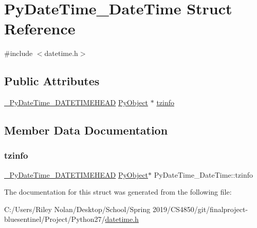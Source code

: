 \hypertarget{struct_py_date_time___date_time}{}\section{Py\+Date\+Time\+\_\+\+Date\+Time Struct Reference}
\label{struct_py_date_time___date_time}


{\ttfamily \#include $<$datetime.\+h$>$}

\subsection*{Public Attributes}
\begin{DoxyCompactItemize}
\item 
\mbox{\hyperlink{datetime_8h_a6234d690c9278e610c9201ad7190dd0e}{\+\_\+\+Py\+Date\+Time\+\_\+\+D\+A\+T\+E\+T\+I\+M\+E\+H\+E\+AD}} \mbox{\hyperlink{_python27_2object_8h_aadc84ac7aed2cfa6f20c25f62bf3dac7}{Py\+Object}} $\ast$ \mbox{\hyperlink{struct_py_date_time___date_time_a11483552924818dd195700bba9e1f492}{tzinfo}}
\end{DoxyCompactItemize}


\subsection{Member Data Documentation}
\mbox{\label{struct_py_date_time___date_time_a11483552924818dd195700bba9e1f492}} 
\subsubsection{\texorpdfstring{tzinfo}{tzinfo}}
{\footnotesize\ttfamily \mbox{\hyperlink{datetime_8h_a6234d690c9278e610c9201ad7190dd0e}{\+\_\+\+Py\+Date\+Time\+\_\+\+D\+A\+T\+E\+T\+I\+M\+E\+H\+E\+AD}} \mbox{\hyperlink{_python27_2object_8h_aadc84ac7aed2cfa6f20c25f62bf3dac7}{Py\+Object}}$\ast$ Py\+Date\+Time\+\_\+\+Date\+Time\+::tzinfo}



The documentation for this struct was generated from the following file\+:\begin{DoxyCompactItemize}
\item 
C\+:/\+Users/\+Riley Nolan/\+Desktop/\+School/\+Spring 2019/\+C\+S4850/git/finalproject-\/bluesentinel/\+Project/\+Python27/\mbox{\hyperlink{datetime_8h}{datetime.\+h}}\end{DoxyCompactItemize}
